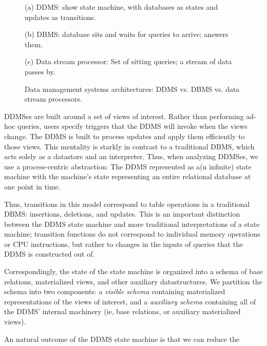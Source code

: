 \begin{figure}
(a) DDMS: show state machine, with databases as states and updates as transitions.

(b) DBMS: database sits and waits for queries to arrive; answers them.

(c) Data stream processor: Set of sitting queries; a stream of data passes by.

\caption{Data management systems architectures: DDMS vs. DBMS vs. data stream processors.}
\end{figure}


DDMSes are built around a set of views of interest.  Rather than performing ad-hoc queries, users specify triggers that the DDMS will invoke when the views change.  The DDMS is built to process updates and apply them efficiently to those views.  This mentality is starkly in contrast to a traditional DBMS, which acts solely as a datastore and an interpreter.  Thus, when analyzing DDMSes, we use a process-centric abstraction: The DDMS represented as a(n infinite) state machine with the machine's state representing an entire relational database at one point in time.

Thus, transitions in this model correspond to table operations in a traditional DBMS: insertions, deletions, and updates.  This is an important distinction between the DDMS state machine and more traditional interpretations of a state machine; transition functions do not correspond to individual memory operations or CPU instructions, but rather to changes in the inputs of queries that the DDMS is constructed out of.

Correspondingly, the state of the state machine is organized into a schema of base relations, materialized views, and other auxiliary datastructures.  We partition the schema into two components: a \textit{visible schema} containing materialized representations of the views of interest, and a \textit{auxiliary schema} containing all of the DDMS' internal machinery (ie, base relations, or auxiliary materialized views).

An natural outcome of the DDMS state machine is that we can reduce the 



